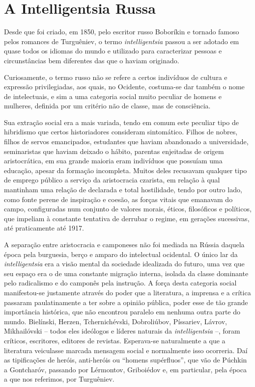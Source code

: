 \section{A Intelligentsia Russa}

Desde que foi criado, em 1850, pelo escritor russo Boboríkin e tornado
famoso pelos romances de Turguêniev, o termo \emph{intelligentsia}
passou a ser adotado em quase todos os idiomas do mundo e utilizado para
caracterizar pessoas e circunstâncias bem diferentes das que o haviam
originado.

Curiosamente, o termo russo não se refere a certos indivíduos de cultura
e expressão privilegiadas, aos quais, no Ocidente, costuma-se dar também
o nome de intelectuais, e sim a uma categoria social muito peculiar de
homens e mulheres, definida por um critério não de classe, mas de
consciência.

Sua extração social era a mais variada, tendo em comum este peculiar
tipo de hibridismo que certos historiadores consideram sintomático.
Filhos de nobres, filhos de servos emancipados, estudantes que haviam
abandonado a universidade, seminaristas que haviam deixado o hábito,
parentas enjeitadas de origem aristocrática, em sua grande maioria eram
indivíduos que possuíam uma educação, apesar da formação incompleta.
Muitos deles recusavam qualquer tipo de emprego público a serviço da
aristocracia czarista, em relação à qual mantinham uma relação de
declarada e total hostilidade, tendo por outro lado, como fonte perene
de inspiração e coesão, as forças vitais que emanavam do campo,
configuradas num conjunto de valores morais, éticos, filosóficos e
políticos, que impeliam à constante tentativa de derrubar o regime, em
gerações sucessivas, até praticamente até 1917.

A separação entre aristocracia e camponeses não foi mediada na Rússia
daquela época pela burguesia, berço e amparo do intelectual ocidental. O
único lar da \emph{intelligentsia} era a visão mental da sociedade
idealizada do futuro, uma vez que seu espaço era o de uma constante
migração interna, isolada da classe dominante pelo radicalismo e do
camponês pela instrução. A força desta categoria social manifestou-se
justamente através do poder que a literatura, a imprensa e a crítica
passaram paulatinamente a ter sobre a opinião pública, poder esse de tão
grande importância histórica, que não encontrou paralelo em nenhuma
outra parte do mundo. Bielínski, Herzen, Tchernichévski, Dobroliúbov,
Píssariev, Lávrov, Mikhailóvski -- todos eles ideólogos e líderes
naturais da \emph{intelligentsia} --, foram críticos, escritores,
editores de revistas. Esperava-se naturalmente a que a literatura
veiculasse marcada mensagem social e normalmente isso ocorreria. Daí as
tipificações de heróis, anti-heróis ou ``homens supérfluos'', que vão de
Púchkin a Gontcharóv, passando por Lérmontov, Griboiédov e, em
particular, pela época a que nos referimos, por Turguêniev.

